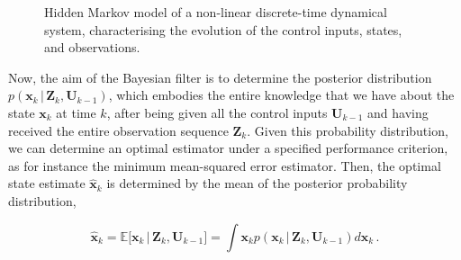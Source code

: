 \begin{figure}[t]
\begin{center}
\end{center}
\caption[Hidden Markov model of a non-linear discrete-time dynamical system.]{Hidden Markov model of a non-linear discrete-time dynamical system, characterising the evolution of the control inputs, states, and observations.}
\label{fig:generic-ss-model}
\end{figure}


Now, the aim of the Bayesian filter is to determine the posterior distribution $p(\bm{x}_k\,|\,\bm{Z}_{k}, \bm{U}_{k-1})$, which embodies the entire knowledge that we have about the state $\bm{x}_k$ at time $k$, after being given all the control inputs $\bm{U}_{k-1}$ and having received the entire observation sequence $\bm{Z}_k$. Given this probability distribution, we can determine an optimal estimator under a specified performance criterion, as for instance the minimum mean-squared error estimator. Then, the optimal state estimate $\hat{\bm{x}}_k$ is determined by the mean of the posterior probability distribution, 

\begin{equation}
  \hat{\bm{x}}_k = \mathbb{E}\big[\bm{x}_k\,|\,\bm{Z}_{k}, \bm{U}_{k-1}\big] = \int \bm{x}_k p(\bm{x}_k\,|\,\bm{Z}_{k}, \bm{U}_{k-1}) d\bm{x}_k\,.
\end{equation}


